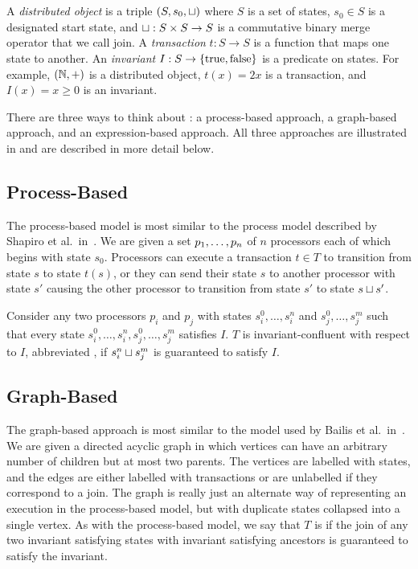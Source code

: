 \section{\Iconfluence{}}
A \emph{distributed object} is a triple $(S, s_0, \sqcup)$ where $S$ is a set of
states, $s_0 \in S$ is a designated start state, and $\sqcup: S \times S \to S$
is a commutative binary merge operator that we call join. A \emph{transaction}
$t: S \to S$ is a function that maps one state to another. An \emph{invariant}
$I: S \to \{\text{true}, \text{false}\}$ is a predicate on states. For
example, $(\mathbb{N}, +)$ is a distributed object, $t(x) = 2x$ is a transaction,
and $I(x) = x \geq 0$ is an invariant.

There are three ways to think about \Iconfluence{}: a process-based approach, a
graph-based approach, and an expression-based approach. All three approaches
are illustrated in  and are described in more
detail below.



\subsection{Process-Based}
The process-based model is most similar to the process model described by
Shapiro et al.\ in~\cite{shapiro2011conflict}. We are given a set
${p}_{1}, \ldots, {p}_{n}$ of $n$ processors each of which begins with state $s_0$.
Processors can execute a transaction $t \in T$ to transition from state $s$ to
state $t(s)$, or they can send their state $s$ to another processor with state
$s'$ causing the other processor to transition from state $s'$ to state $s
\sqcup s'$.

Consider any two processors $p_i$ and $p_j$ with states $s_i^0, \ldots, s_i^n$
and $s_j^0, \ldots, s_j^m$ such that every state $s_i^0, \ldots, s_i^n, s_j^0,
\ldots, s_j^m$ satisfies $I$. $T$ is invariant-confluent with respect to $I$,
abbreviated \Iconfluent{}, if $s_i^n \sqcup s_j^m$ is guaranteed to satisfy $I$.

\subsection{Graph-Based}
The graph-based approach is most similar to the model used by Bailis et al.\
in~\cite{bailis2014coordination}. We are given a directed acyclic graph in
which vertices can have an arbitrary number of children but at most two
parents. The vertices are labelled with states, and the edges are either
labelled with transactions or are unlabelled if they correspond to a join. The
graph is really just an alternate way of representing an execution in the
process-based model, but with duplicate states collapsed into a single vertex.
As with the process-based model, we say that $T$ is \Iconfluent{} if the join
of any two invariant satisfying states with invariant satisfying ancestors is
guaranteed to satisfy the invariant.

